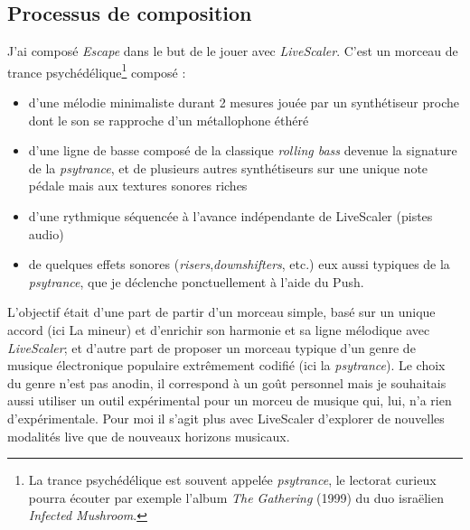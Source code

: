 \subsection{Processus de composition}
\begin{comment}
  Liste des contraintes :
\begin{enumerate}
  \item Toutes les pistes doivent être MIDI : une piste audio ne serait pas impactée par les changements de gamme
  \item Pauvreté harmonique : le morceau doit être relativement pauvre harmoniquement, idéalement rester sur le même accord tout le long.
\end{enumerate}
Préparation d'une session pour utiliser Live Scaler
\begin{enumerate}
  \item Passer toutes les pistes en MIDI (utiliser des sampleurs pour les pistes audio )
  \item S'assurer qu'on ne sort pas de la tessiture des instruments
  \item Mettre les synthétiseurs et sampleurs en mode legato au maximum.
\end{enumerate}
\end{comment}


J'ai composé \emph{Escape} dans le but de le jouer avec \emph{LiveScaler}. C'est un morceau de trance psychédélique\footnote{La trance psychédélique est souvent  appelée \emph{psytrance}, le lectorat curieux pourra écouter par exemple l'album \emph{The Gathering} (1999) du duo israëlien \emph{Infected Mushroom}.} composé  : 
\begin{itemize}
  \item d'une mélodie minimaliste durant 2 mesures jouée par un synthétiseur proche dont le son se rapproche d'un métallophone éthéré
  \item d'une ligne de basse composé de la classique \emph{rolling bass} devenue la signature de la \emph{psytrance}, et de  plusieurs autres synthétiseurs sur une unique note pédale mais aux textures sonores riches
  \item d'une rythmique séquencée à l'avance indépendante de LiveScaler (pistes audio)
  \item de quelques effets sonores (\emph{risers},\emph{downshifters}, etc.) eux aussi typiques de la \emph{psytrance}, que je déclenche ponctuellement à l'aide du Push.
\end{itemize}

L'objectif était d'une part de partir d'un morceau simple, basé sur un unique accord (ici La mineur) et d'enrichir son harmonie et sa ligne mélodique avec \emph{LiveScaler}; et d'autre part de proposer un morceau typique d'un genre de musique électronique populaire extrêmement codifié (ici la \emph{psytrance}). Le choix du genre n'est pas anodin, il correspond à un goût personnel mais je souhaitais aussi utiliser un outil expérimental pour un morceu de musique qui, lui, n'a rien d'expérimentale. Pour moi il s'agit plus avec LiveScaler d'explorer de nouvelles modalités live que de nouveaux horizons musicaux.
